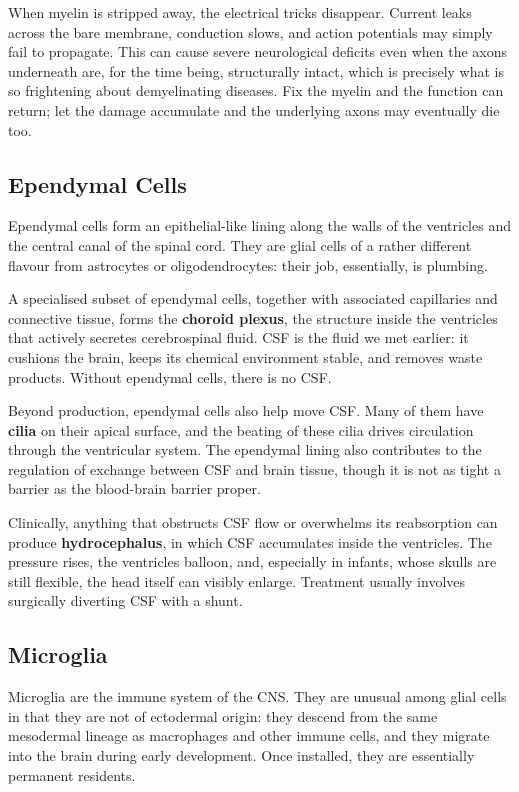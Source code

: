 \documentclass[11pt]{article}
\begin{document}
When myelin is stripped away, the electrical tricks disappear. Current leaks across the bare membrane, conduction slows, and action potentials may simply fail to propagate. This can cause severe neurological deficits even when the axons underneath are, for the time being, structurally intact, which is precisely what is so frightening about demyelinating diseases. Fix the myelin and the function can return; let the damage accumulate and the underlying axons may eventually die too.

\subsection{Ependymal Cells}

Ependymal cells form an epithelial-like lining along the walls of the ventricles and the central canal of the spinal cord. They are glial cells of a rather different flavour from astrocytes or oligodendrocytes: their job, essentially, is plumbing.

A specialised subset of ependymal cells, together with associated capillaries and connective tissue, forms the \textbf{choroid plexus}, the structure inside the ventricles that actively secretes cerebrospinal fluid. CSF is the fluid we met earlier: it cushions the brain, keeps its chemical environment stable, and removes waste products. Without ependymal cells, there is no CSF.

Beyond production, ependymal cells also help move CSF. Many of them have \textbf{cilia} on their apical surface, and the beating of these cilia drives circulation through the ventricular system. The ependymal lining also contributes to the regulation of exchange between CSF and brain tissue, though it is not as tight a barrier as the blood-brain barrier proper.

Clinically, anything that obstructs CSF flow or overwhelms its reabsorption can produce \textbf{hydrocephalus}, in which CSF accumulates inside the ventricles. The pressure rises, the ventricles balloon, and, especially in infants, whose skulls are still flexible, the head itself can visibly enlarge. Treatment usually involves surgically diverting CSF with a shunt.

\subsection{Microglia}

Microglia are the immune system of the CNS. They are unusual among glial cells in that they are not of ectodermal origin: they descend from the same mesodermal lineage as macrophages and other immune cells, and they migrate into the brain during early development. Once installed, they are essentially permanent residents.
\end{document}
